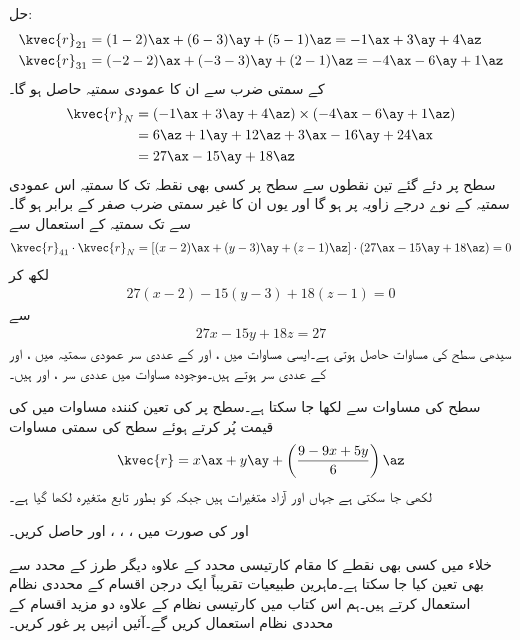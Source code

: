حل:
\begin{align*}
\kvec{r}_{21}&=(1-2)\ax+(6-3)\ay+(5-1)\az=-1\ax+3\ay+4\az\\
\kvec{r}_{31}&=(-2-2)\ax+(-3-3)\ay+(2-1)\az=-4\ax-6\ay+1\az
\end{align*}
کے سمتی ضرب سے ان کا عمودی سمتیہ حاصل ہو گا۔
\begin{align*}
\kvec{r}_N&=(-1\ax+3\ay+4\az) \times (-4\ax-6\ay+1\az)\\
&=6\az+1\ay+12\az+3\ax-16\ay+24\ax\\
&=27\ax-15\ay+18\az
\end{align*}
سطح پر دئے گئے تین نقطوں سے سطح پر کسی بھی نقطہ  تک کا سمتیہ اس عمودی سمتیہ کے نوے درجے زاویہ پر ہو گا اور یوں ان کا غیر سمتی ضرب صفر کے برابر ہو گا۔ سے  تک سمتیہ  کے استعمال سے
\begin{align*}
\kvec{r}_{41} \cdot \kvec{r}_{N}=[(x-2)\ax+(y-3)\ay+(z-1)\az] \cdot (27\ax-15\ay+18\az)=0
\end{align*}
لکھ کر
\begin{align*}
27(x-2)-15(y-3)+18(z-1)=0
\end{align*}
سے
\begin{align*}
27x-15y+18z=27
\end{align*}
سیدھی سطح کی مساوات حاصل ہوتی ہے۔ایسی مساوات میں ،  اور  کے عددی سر  عمودی سمتیہ میں ،  اور  کے عددی سر ہوتے ہیں۔موجودہ مساوات میں عددی سر ،  اور  ہیں۔

سطح کی مساوات سے  لکھا جا سکتا ہے۔سطح پر  کی تعین کنندہ مساوات  میں  کی قیمت پُر کرتے ہوئے  سطح کی سمتی مساوات 
\begin{align*}
\kvec{r}=x\ax+y\ay+\left(\frac{9-9x+5y}{6}\right)\az
\end{align*}
لکھی جا سکتی ہے جہاں  اور  آزاد متغیرات ہیں جبکہ  کو بطور تابع متغیرہ لکھا گیا ہے۔

 اور  کی صورت میں ، ، ،  اور  حاصل کریں۔ 

خلاء میں کسی بھی نقطے کا مقام کارتیسی محدد کے علاوہ دیگر طرز کے محدد سے بھی تعین کیا جا سکتا ہے۔ماہرین طبیعیات  تقریباً ایک درجن اقسام کے محددی نظام استعمال کرتے ہیں۔ہم اس کتاب میں کارتیسی نظام کے علاوہ دو مزید اقسام کے محددی نظام استعمال کریں گے۔آئیں انہیں پر غور کریں۔ 

